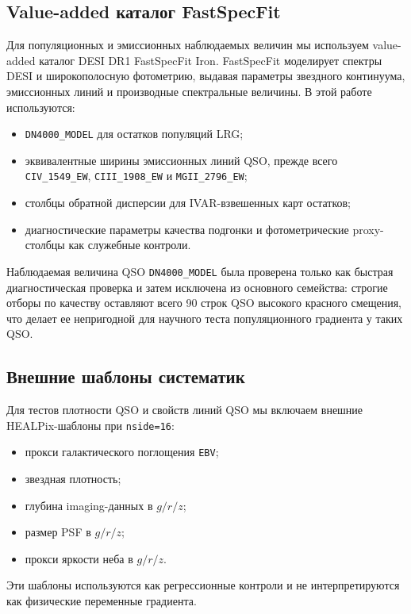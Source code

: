 \documentclass[11pt]{article}
\begin{document}
\subsection{Value-added каталог FastSpecFit}

Для популяционных и эмиссионных наблюдаемых величин мы используем value-added каталог DESI DR1 FastSpecFit Iron. FastSpecFit моделирует спектры DESI и широкополосную фотометрию, выдавая параметры звездного континуума, эмиссионных линий и производные спектральные величины. В этой работе используются:

\begin{itemize}
    \item \texttt{DN4000\_MODEL} для остатков популяций LRG;
    \item эквивалентные ширины эмиссионных линий QSO, прежде всего \texttt{CIV\_1549\_EW}, \texttt{CIII\_1908\_EW} и \texttt{MGII\_2796\_EW};
    \item столбцы обратной дисперсии для IVAR-взвешенных карт остатков;
    \item диагностические параметры качества подгонки и фотометрические proxy-столбцы как служебные контроли.
\end{itemize}

Наблюдаемая величина QSO \texttt{DN4000\_MODEL} была проверена только как быстрая диагностическая проверка и затем исключена из основного семейства: строгие отборы по качеству оставляют всего 90 строк QSO высокого красного смещения, что делает ее непригодной для научного теста популяционного градиента у таких QSO.

\subsection{Внешние шаблоны систематик}

Для тестов плотности QSO и свойств линий QSO мы включаем внешние HEALPix-шаблоны при \texttt{nside=16}:

\begin{itemize}
    \item прокси галактического поглощения \texttt{EBV};
    \item звездная плотность;
    \item глубина imaging-данных в $g/r/z$;
    \item размер PSF в $g/r/z$;
    \item прокси яркости неба в $g/r/z$.
\end{itemize}

Эти шаблоны используются как регрессионные контроли и не интерпретируются как физические переменные градиента.
\end{document}
